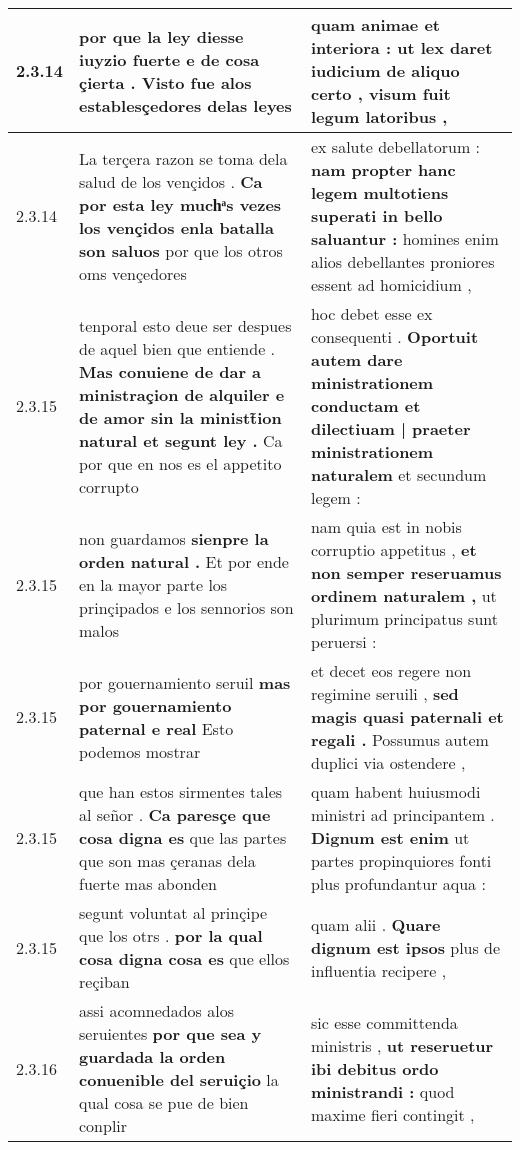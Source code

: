 \begin{tabular}{|p{1cm}|p{6.5cm}|p{6.5cm}|}
2.3.14 & por que la ley diesse iuyzio fuerte \textbf{ e de cosa çierta . } Visto fue alos establesçedores delas leyes & quam animae et interiora : \textbf{ ut lex daret iudicium de aliquo certo , } visum fuit legum latoribus , \\\hline
2.3.14 & La terçera razon se toma dela salud de los vençidos . \textbf{ Ca por esta ley muchͣs vezes los vençidos enla batalla son saluos } por que los otros oms vençedores & ex salute debellatorum : \textbf{ nam propter hanc legem multotiens superati in bello saluantur : } homines enim alios debellantes proniores essent ad homicidium , \\\hline
2.3.15 & tenporal esto deue ser despues de aquel bien que entiende . \textbf{ Mas conuiene de dar a ministraçion de alquiler e de amor sin la ministt̃ion natural et segunt ley . } Ca por que en nos es el appetito corrupto & hoc debet esse ex consequenti . \textbf{ Oportuit autem dare ministrationem conductam et dilectiuam | praeter ministrationem naturalem } et secundum legem : \\\hline
2.3.15 & non guardamos \textbf{ sienpre la orden natural . } Et por ende en la mayor parte los prinçipados e los sennorios son malos & nam quia est in nobis corruptio appetitus , \textbf{ et non semper reseruamus ordinem naturalem , } ut plurimum principatus sunt peruersi : \\\hline
2.3.15 & por gouernamiento seruil \textbf{ mas por gouernamiento paternal e real } Esto podemos mostrar & et decet eos regere non regimine seruili , \textbf{ sed magis quasi paternali et regali . } Possumus autem duplici via ostendere , \\\hline
2.3.15 & que han estos sirmentes tales al señor . \textbf{ Ca paresçe que cosa digna es } que las partes que son mas çeranas dela fuerte mas abonden & quam habent huiusmodi ministri ad principantem . \textbf{ Dignum est enim } ut partes propinquiores fonti plus profundantur aqua : \\\hline
2.3.15 & segunt voluntat al prinçipe que los otrs . \textbf{ por la qual cosa digna cosa es } que ellos reçiban & quam alii . \textbf{ Quare dignum est ipsos } plus de influentia recipere , \\\hline
2.3.16 & assi acomnedados alos seruientes \textbf{ por que sea y guardada la orden conuenible del seruiçio } la qual cosa se pue de bien conplir & sic esse committenda ministris , \textbf{ ut reseruetur ibi debitus ordo ministrandi : } quod maxime fieri contingit , \\\hline

\end{tabular}
